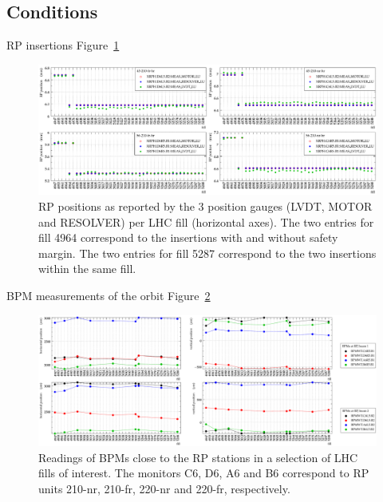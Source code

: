 \documentclass[TOTEM]{cern/cernphprep}
\def\hang{\hangindent=\parindent}
\def\>{\par\vskip\itskip\parindent\itindent\indent\hang\llap{\hbox to3mm{$\bullet$\hss}}}
\def\>E{\par\vskip\itskip\parindent\itindent\indent\hang\llap{\hbox to3mm{\hss}}}
\def\>>{\par\vskip\iitskip\parindent\iitindent\indent\hang\llap{\hbox to\iitindent{\hss--\ }}}
\begin{document}
\subsection{Conditions}

\> RP insertions
Figure~\ref{fig:cond_rp}

\begin{figure}[h!]
\begin{center}
\includegraphics[width=1\hsize]{fig/conditions/rp_positions_rps.pdf}
\caption{%
RP positions as reported by the 3 position gauges (LVDT, MOTOR and RESOLVER) per LHC fill (horizontal axes). The two entries for fill 4964 correspond to the insertions with and without safety margin. The two entries for fill 5287 correspond to the two insertions within the same fill.
}
\label{fig:cond_rp}
\end{center}
\end{figure}


\> BPM measurements of the orbit
Figure~\ref{fig:cond_bpm}

\begin{figure}[h!]
\begin{center}
\includegraphics[width=1\hsize]{fig/conditions/bpm_comparison.pdf}
\caption{%
Readings of BPMs close to the RP stations in a selection of LHC fills of interest. The monitors C6, D6, A6 and B6 correspond to RP units 210-nr, 210-fr, 220-nr and 220-fr, respectively.
}
\label{fig:cond_bpm}
\end{center}
\end{figure}
\end{document}
